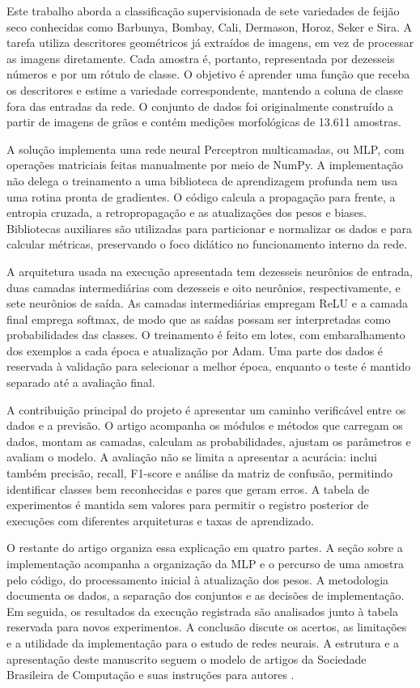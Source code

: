 \documentclass[12pt]{article}
\begin{document}
Este trabalho aborda a classificação supervisionada de sete variedades de feijão seco conhecidas como Barbunya, Bombay, Cali, Dermason, Horoz, Seker e Sira. A tarefa utiliza descritores geométricos já extraídos de imagens, em vez de processar as imagens diretamente. Cada amostra é, portanto, representada por dezesseis números e por um rótulo de classe. O objetivo é aprender uma função que receba os descritores e estime a variedade correspondente, mantendo a coluna de classe fora das entradas da rede. O conjunto de dados foi originalmente construído a partir de imagens de grãos e contém medições morfológicas de 13.611 amostras.

A solução implementa uma rede neural Perceptron multicamadas, ou MLP, com operações matriciais feitas manualmente por meio de NumPy. A implementação não delega o treinamento a uma biblioteca de aprendizagem profunda nem usa uma rotina pronta de gradientes. O código calcula a propagação para frente, a entropia cruzada, a retropropagação e as atualizações dos pesos e biases. Bibliotecas auxiliares são utilizadas para particionar e normalizar os dados e para calcular métricas, preservando o foco didático no funcionamento interno da rede.

A arquitetura usada na execução apresentada tem dezesseis neurônios de entrada, duas camadas intermediárias com dezesseis e oito neurônios, respectivamente, e sete neurônios de saída. As camadas intermediárias empregam ReLU e a camada final emprega softmax, de modo que as saídas possam ser interpretadas como probabilidades das classes. O treinamento é feito em lotes, com embaralhamento dos exemplos a cada época e atualização por Adam. Uma parte dos dados é reservada à validação para selecionar a melhor época, enquanto o teste é mantido separado até a avaliação final.

A contribuição principal do projeto é apresentar um caminho verificável entre os dados e a previsão. O artigo acompanha os módulos e métodos que carregam os dados, montam as camadas, calculam as probabilidades, ajustam os parâmetros e avaliam o modelo. A avaliação não se limita a apresentar a acurácia: inclui também precisão, recall, F1-score e análise da matriz de confusão, permitindo identificar classes bem reconhecidas e pares que geram erros. A tabela de experimentos é mantida sem valores para permitir o registro posterior de execuções com diferentes arquiteturas e taxas de aprendizado.

O restante do artigo organiza essa explicação em quatro partes. A seção sobre a implementação acompanha a organização da MLP e o percurso de uma amostra pelo código, do processamento inicial à atualização dos pesos. A metodologia documenta os dados, a separação dos conjuntos e as decisões de implementação. Em seguida, os resultados da execução registrada são analisados junto à tabela reservada para novos experimentos. A conclusão discute os acertos, as limitações e a utilidade da implementação para o estudo de redes neurais. A estrutura e a apresentação deste manuscrito seguem o modelo de artigos da Sociedade Brasileira de Computação e suas instruções para autores \cite{nedel2017sbc}.
\end{document}
